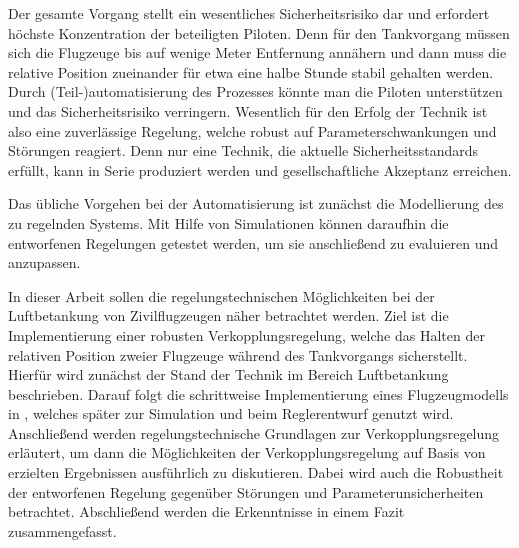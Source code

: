 Der gesamte Vorgang stellt ein wesentliches Sicherheitsrisiko dar und erfordert höchste Konzentration der beteiligten Piloten. Denn für den Tankvorgang müssen sich die Flugzeuge bis auf wenige Meter Entfernung annähern und dann muss die  relative Position zueinander für etwa eine halbe Stunde stabil gehalten werden.
Durch (Teil-)automatisierung des Prozesses könnte man die Piloten unterstützen und das Sicherheitsrisiko verringern.
  Wesentlich für den Erfolg der Technik ist also eine zuverlässige Regelung, welche robust auf Parameterschwankungen und Störungen reagiert.
Denn nur eine Technik, die aktuelle Sicherheitsstandards erfüllt, kann in Serie produziert werden und gesellschaftliche Akzeptanz erreichen.
 
Das übliche Vorgehen bei der Automatisierung ist zunächst die Modellierung des zu regelnden Systems.
Mit Hilfe von Simulationen können daraufhin die entworfenen Regelungen getestet werden, um sie anschließend zu evaluieren und anzupassen.

In dieser Arbeit sollen die regelungstechnischen Möglichkeiten bei der Luftbetankung von Zivilflugzeugen näher betrachtet werden. Ziel ist die Implementierung einer robusten Verkopplungsregelung, welche das Halten der relativen Position zweier Flugzeuge während des Tankvorgangs sicherstellt.
Hierfür wird zunächst der Stand der Technik im Bereich Luftbetankung beschrieben.
Darauf folgt die schrittweise Implementierung eines Flugzeugmodells in \MatSim, welches später zur Simulation und beim Reglerentwurf genutzt wird.
Anschließend werden regelungstechnische Grundlagen zur Verkopplungsregelung erläutert, um dann die Möglichkeiten der Verkopplungsregelung auf Basis von erzielten Ergebnissen ausführlich zu diskutieren. Dabei wird auch die Robustheit der entworfenen Regelung gegenüber Störungen und Parameterunsicherheiten betrachtet.
Abschließend werden die Erkenntnisse in einem Fazit zusammengefasst.

%
%


